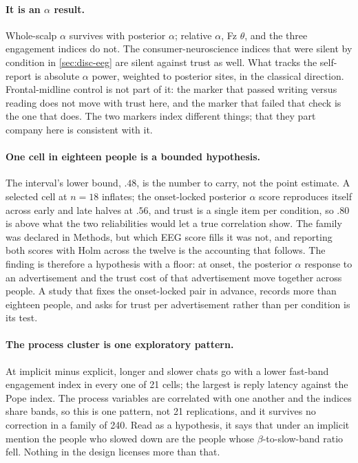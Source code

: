 \paragraph{It is an \(\alpha\) result.}
Whole-scalp \(\alpha\) survives with posterior \(\alpha\); relative \(\alpha\), Fz \(\theta\), and the three engagement indices do not. The consumer-neuroscience indices that were silent by condition in \autoref{sec:disc-eeg} are silent against trust as well. What tracks the self-report is absolute \(\alpha\) power, weighted to posterior sites, in the classical direction. Frontal-midline control is not part of it: the marker that passed writing versus reading does not move with trust here, and the marker that failed that check is the one that does. The two markers index different things; that they part company here is consistent with it.

\paragraph{One cell in eighteen people is a bounded hypothesis.}
The interval's lower bound, \(.48\), is the number to carry, not the point estimate. A selected cell at \(n=18\) inflates; the onset-locked posterior \(\alpha\) score reproduces itself across early and late halves at \(.56\), and trust is a single item per condition, so \(.80\) is above what the two reliabilities would let a true correlation show. The family was declared in Methods, but which EEG score fills it was not, and reporting both scores with Holm across the twelve is the accounting that follows. The finding is therefore a hypothesis with a floor: at onset, the posterior \(\alpha\) response to an advertisement and the trust cost of that advertisement move together across people. A study that fixes the onset-locked pair in advance, records more than eighteen people, and asks for trust per advertisement rather than per condition is its test.

\paragraph{The process cluster is one exploratory pattern.}
At implicit minus explicit, longer and slower chats go with a lower fast-band engagement index in every one of 21 cells; the largest is reply latency against the Pope index. The process variables are correlated with one another and the indices share bands, so this is one pattern, not 21 replications, and it survives no correction in a family of 240. Read as a hypothesis, it says that under an implicit mention the people who slowed down are the people whose \(\beta\)-to-slow-band ratio fell. Nothing in the design licenses more than that.

